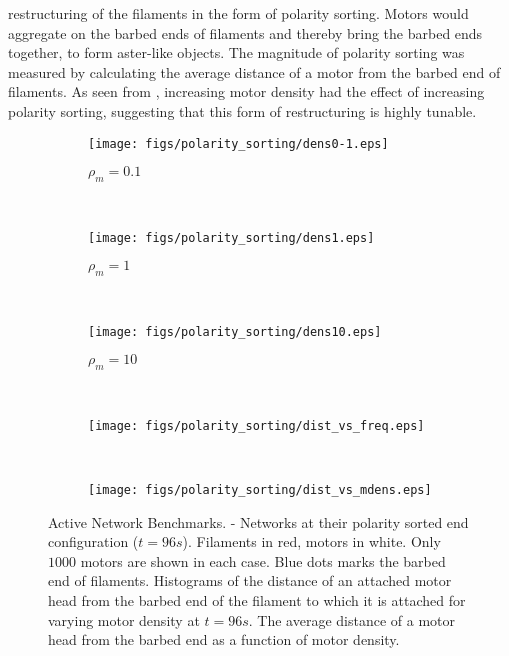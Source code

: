 \documentclass[12pt]{article}
\begin{document}
restructuring of the filaments in the form of polarity sorting. Motors would aggregate on the barbed ends of filaments
and thereby bring the barbed ends together, to form aster-like objects. The magnitude of polarity sorting was measured
by calculating the average distance of a motor from the barbed end of filaments. As seen from 
, increasing motor density had the effect of increasing polarity sorting, suggesting that this
form of restructuring is highly tunable. 
\begin{figure}[H] 
  \begin{subfigure}{0.3\textwidth}
    \centering
    \caption{\label{fig:rholops}$\rho_m=0.1$}
    \texttt{[image: figs/polarity\_sorting/dens0-1.eps]}
  \end{subfigure}
  ~
  \begin{subfigure}{0.3\textwidth}
    \centering
    \caption{$\rho_m=1$}
    \texttt{[image: figs/polarity\_sorting/dens1.eps]}
  \end{subfigure}
  ~
  \begin{subfigure}{0.3\textwidth}
    \centering
    \caption{\label{fig:rhohips}$\rho_m = 10$}
    \texttt{[image: figs/polarity\_sorting/dens10.eps]}
  \end{subfigure}
  ~
  \begin{subfigure}{0.43\textwidth}
    \centering
    \texttt{[image: figs/polarity\_sorting/dist\_vs\_freq.eps]}
    \caption{\label{fig:dist_hist}}
  \end{subfigure}
  ~
  \begin{subfigure}{0.4\textwidth}
    \centering
    \texttt{[image: figs/polarity\_sorting/dist\_vs\_mdens.eps]}
    \caption{\label{fig:dist_vs_mdens}}
  \end{subfigure}
  \caption{%
  \label{fig:polarity_sorting}%
  Active Network Benchmarks. - 
  Networks at their polarity sorted end configuration ($t=96s$). 
  Filaments in red, motors in white. Only $1000$ motors are shown in each case.
  Blue dots marks the barbed end of filaments.  Histograms of the distance of an attached motor
head from the barbed end of the filament to which it is attached for varying motor density at $t=96s$.
 The average distance of a motor head from the barbed end as a function of motor density. } 
\end{figure}
\end{document}
